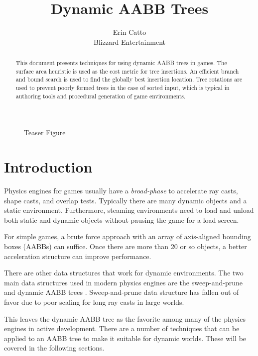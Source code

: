 \documentclass{article}
\begin{document}
\title{Dynamic AABB Trees}
\author{Erin Catto\\Blizzard Entertainment}
\maketitle

\begin{figure}
	\begin{center}
	\end{center}
	\caption{Teaser Figure}
	\label{fig:teaser}
\end{figure}

\begin{abstract}
\small
This document presents techniques for using dynamic AABB trees in games. The surface area heuristic is used as the cost metric for tree insertions. An efficient branch and bound search is used to find the globally best insertion location. Tree rotations are used to prevent poorly formed trees in the case of sorted input, which is typical in authoring tools and procedural generation of game environments.
\end{abstract}

\section{Introduction}
Physics engines for games usually have a \emph{broad-phase} to accelerate ray casts, shape casts, and overlap tests. Typically there are many dynamic objects and a static environment. Furthermore, steaming environments need to load and unload both static and dynamic objects without pausing the game for a load screen.

For simple games, a brute force approach with an array of axis-aligned bounding boxes (AABBs) can suffice. Once there are more than 20 or so objects, a better acceleration structure can improve performance. 

There are other data structures that work for dynamic environments. The two main data structures used in modern physics engines are the sweep-and-prune \cite{Bergen2004} and dynamic AABB trees \cite{Presson2008}. Sweep-and-prune data structure has fallen out of favor due to poor scaling for long ray casts in large worlds.

This leaves the dynamic AABB tree as the favorite among many of the physics engines in active development. There are a number of techniques that can be applied to an AABB tree to make it suitable for dynamic worlds. These will be covered in the following sections.
\end{document}
